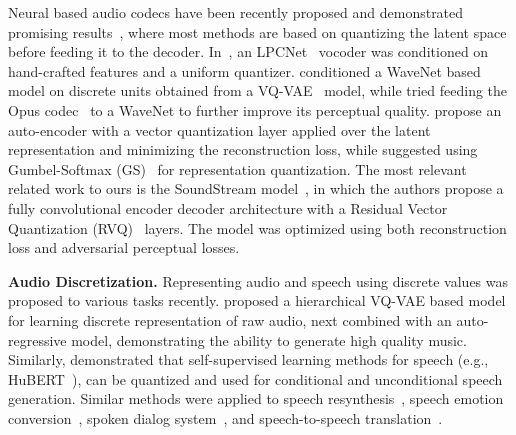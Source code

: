 Neural based audio codecs have been recently proposed and demonstrated promising results~\citep{kleijn2018wavenet,valin2019real, lim2020robust, kleijn2021generative, zeghidour2021soundstream, omran2022disentangling, lin2022speech, jayashankar2022architecture, livariable, jiang2022end}, where most methods are based on quantizing the latent space before feeding it to the decoder. In~\citet{valin2019real}, an LPCNet~\citep{valin2019lpcnet} vocoder was conditioned on hand-crafted features and a uniform quantizer. \citet{garbacea2019low} conditioned a WaveNet based model on discrete units obtained from a VQ-VAE~\citep{van2017neural, razavi2019generating} model, while \citet{skoglund2019improving} tried feeding the Opus codec~\citep{valin2012definition} to a WaveNet to further improve its perceptual quality. \citet{jayashankar2022architecture, jiang2022end} propose an auto-encoder with a vector quantization layer applied over the latent representation and minimizing the reconstruction loss, while \citet{livariable} suggested using Gumbel-Softmax (GS)~\citep{jang2016categorical} for representation quantization. The most relevant related work to ours is the SoundStream model~\citep{zeghidour2021soundstream}, in which the authors propose a fully convolutional encoder decoder architecture with a Residual Vector Quantization (RVQ)~\citep{gray1984vector, vasuki2006review} layers. The model was optimized using both reconstruction loss and adversarial perceptual losses.

{\noindent \bf Audio Discretization.}
Representing audio and speech using discrete values was proposed to various tasks recently. \citet{dieleman2018challenge, dhariwal2020jukebox} proposed a hierarchical VQ-VAE based model for learning discrete representation of raw audio, next combined with an auto-regressive model, demonstrating the ability to generate high quality music. Similarly, \citet{lakhotia2021generative, kharitonov2021text} demonstrated that self-supervised learning methods for speech (e.g., HuBERT~\citep{hsu2021hubert}), can be quantized and used for conditional and unconditional speech generation. Similar methods were applied to speech resynthesis~\citep{polyak2021speech}, speech emotion conversion~\citep{kreuk2021textless}, spoken dialog system~\citep{nguyen2022generative}, and speech-to-speech translation~\citep{lee2021direct,lee2021textless,popuri2022enhanced}.
